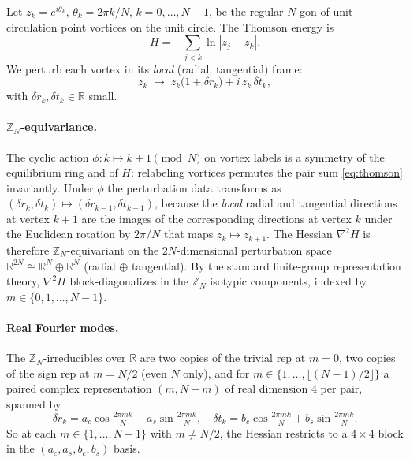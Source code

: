 \documentclass[11pt]{article}
\theoremstyle{remark}
\begin{document}
Let $z_k = e^{i\theta_k}$, $\theta_k = 2\pi k / N$, $k = 0, \ldots, N-1$,
be the regular $N$-gon of unit-circulation point vortices on the unit
circle. The Thomson energy is
\begin{equation}\label{eq:thomson}
  H = -\sum_{j<k} \ln |z_j - z_k|.
\end{equation}
We perturb each vortex in its \emph{local} (radial, tangential) frame:
\begin{equation}\label{eq:perturb}
  z_k \;\longmapsto\; z_k\bigl(1 + \delta r_k\bigr) + i\,z_k\,\delta t_k,
\end{equation}
with $\delta r_k, \delta t_k \in \mathbb{R}$ small.

\paragraph{$\mathbb{Z}_N$-equivariance.}
The cyclic action $\phi : k \mapsto k + 1 \pmod N$ on vortex labels
is a symmetry of the equilibrium ring and of $H$: relabeling vortices
permutes the pair sum \eqref{eq:thomson} invariantly. Under $\phi$
the perturbation data transforms as $(\delta r_k, \delta t_k) \mapsto
(\delta r_{k-1}, \delta t_{k-1})$, because the \emph{local} radial
and tangential directions at vertex $k + 1$ are the images of the
corresponding directions at vertex $k$ under the Euclidean rotation
by $2\pi/N$ that maps $z_k \mapsto z_{k+1}$. The Hessian $\nabla^2 H$
is therefore $\mathbb{Z}_N$-equivariant on the $2N$-dimensional
perturbation space $\mathbb{R}^{2N} \cong \mathbb{R}^N \oplus \mathbb{R}^N$
(radial $\oplus$ tangential). By the standard finite-group
representation theory, $\nabla^2 H$ block-diagonalizes in the
$\mathbb{Z}_N$ isotypic components, indexed by
$m \in \{0, 1, \ldots, N-1\}$.

\paragraph{Real Fourier modes.}
The $\mathbb{Z}_N$-irreducibles over $\mathbb{R}$ are two copies of
the trivial rep at $m = 0$, two copies of the sign rep at $m = N/2$
(even $N$ only), and for
$m \in \{1, \ldots, \lfloor (N-1)/2 \rfloor\}$ a paired complex
representation $(m, N-m)$ of real dimension $4$ per pair, spanned by
\begin{equation}\label{eq:mode-m}
  \delta r_k = a_c\cos\!\tfrac{2\pi m k}{N} + a_s\sin\!\tfrac{2\pi m k}{N},
  \quad
  \delta t_k = b_c\cos\!\tfrac{2\pi m k}{N} + b_s\sin\!\tfrac{2\pi m k}{N}.
\end{equation}
So at each $m \in \{1, \ldots, N-1\}$ with $m \ne N/2$, the Hessian
restricts to a $4 \times 4$ block in the $(a_c, a_s, b_c, b_s)$ basis.
\end{document}

